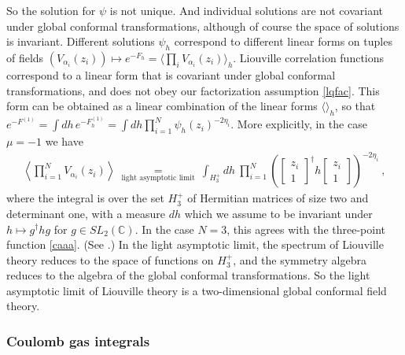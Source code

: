 \documentclass[12pt, a4paper, notitlepage, twoside]{report}
\numberwithin{equation}{section}
\theoremstyle{break}
\begin{document}
So the solution for $\psi$ is not unique. And individual solutions are not covariant under global conformal transformations, although of course the space of solutions is invariant.
Different solutions $\psi_h$ correspond to different linear forms on tuples of fields $(V_{\alpha_i}(z_i)) \mapsto e^{-F_h} = \langle \prod_i V_{\alpha_i}(z_i)\rangle_h$. 
Liouville correlation functions correspond to a linear form that is covariant under global conformal transformations, and does not  obey our factorization assumption \eqref{lqfac}. 
This form can be obtained as a linear combination of the linear forms $\langle \rangle_h$, so that $e^{-F^{(1)}} = \int dh\, e^{-F^{(1)}_h} = \int dh \prod_{i=1}^N \psi_h(z_i)^{-2\eta_i}$. 
More explicitly, in the case $\mu=-1$ we have
\begin{align}
\left\langle\prod_{i=1}^N V_{\alpha_i}(z_i)\right\rangle\ \underset{\text{light\ asymptotic\ limit}}{=}\ \int_{H^+_3} dh\ \prod_{i=1}^N \left( \left[\begin{smallmatrix} z_i \\ 1 \end{smallmatrix}\right]^\dagger h \left[\begin{smallmatrix} z_i \\ 1 \end{smallmatrix}\right] \right)^{-2\eta_i}\ ,
\label{zih}
\end{align}
where the integral is over the set \textbf{\boldmath $H_3^+$} of Hermitian matrices of size two and determinant one, with a measure $dh$ which we assume to be invariant under $h\mapsto g^\dagger hg$ for $g\in SL_2({\mathbb{C}})$.
In the case $N=3$, this agrees with the three-point function \eqref{caaa}. (See \cite{zz95}.) In the light asymptotic limit, the spectrum of Liouville theory reduces to the space of functions on $H_3^+$, and the symmetry algebra reduces to the algebra of the global conformal transformations.
So
the light asymptotic limit of Liouville theory is a two-dimensional global conformal field theory.

\subsubsection{Coulomb gas integrals}
\end{document}
